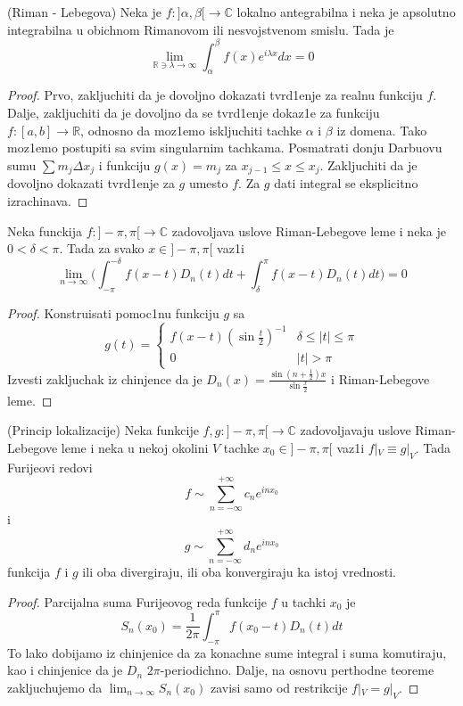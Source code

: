 \documentclass[a4paper,12pt]{article}
\newcommand{\RR}{\mathbb{R}}
\newcommand{\CC}{\mathbb{C}}
\begin{document}
\begin{lema}(Riman - Lebegova) Neka je $f: ]\alpha, \beta[ \to \CC$ lokalno antegrabilna i neka je apsolutno integrabilna u obichnom Rimanovom ili nesvojstvenom smislu. Tada je 
\[\lim_{\RR \ni \lambda \to \infty} \int_{\alpha}^{\beta} f(x) e^{i \lambda x} dx = 0\]
\end{lema}
\begin{proof}
Prvo, zakljuchiti da je dovoljno dokazati tvrd1enje za realnu funkciju $f$. Dalje, zakljuchiti da je dovoljno da se tvrd1enje dokaz1e za funkciju $f: [a,b] \to \RR$, odnosno da moz1emo iskljuchiti tachke $\alpha$ i  $\beta$ iz domena. Tako moz1emo postupiti sa svim singularnim tachkama. Posmatrati donju Darbuovu sumu $\sum m_j \Delta x_j$ i  funkciju $g(x) = m_j$ za $x_{j-1} \leq x \leq x_j$. Zakljuchiti da je dovoljno dokazati tvrd1enje za $g$ umesto $f$. Za $g$ dati integral se eksplicitno izrachinava.
\end{proof}
\begin{tma}
Neka funckija $f:]-\pi, \pi[ \to \CC$ zadovoljava uslove Riman-Lebegove leme i neka je $0 < \delta < \pi$. Tada za svako $x \in ]-\pi, \pi[$ vaz1i
\[\lim_{n \to \infty}\big(\int_{-\pi}^{-\delta}f(x-t)D_n(t) dt + \int_\delta^\pi f(x-t)D_n(t)dt\big) = 0\]
\end{tma}
\begin{proof}
Konstruisati pomoc1nu funkciju $g$ sa
\[
g(t) = \begin{cases}
  f(x-t) {(\sin \frac{t}{2})}^{-1}  & \delta \leq |t| \leq \pi \\
  0 & |t|>\pi
\end{cases}
\]
Izvesti zakljuchak iz chinjence da je $D_n(x) = \frac{\sin(n + \frac{1}{2})x}{\sin \frac{x}{2}}$ i Riman-Lebegove leme.
\end{proof}
\begin{posl}(Princip lokalizacije) Neka funkcije $f,g:]-\pi, \pi[ \to \CC$ zadovoljavaju uslove Riman-Lebegove leme i neka u nekoj okolini $V$ tachke $x_0 \in ]-\pi, \pi[$ vaz1i $f|_V \equiv g|_V$. Tada Furijeovi redovi 
\[f \sim \sum_{n = - \infty}^{+ \infty} c_n e^{inx_0}\]
i
\[g \sim \sum_{n = -\infty}^{+ \infty} d_n e^{inx_0} \]
funkcija $f$ i $g$ ili oba divergiraju, ili oba konvergiraju ka istoj vrednosti.
\end{posl}
\begin{proof}
Parcijalna suma Furijeovog reda funkcije $f$ u tachki $x_0$ je
\[S_n(x_0) = \frac{1}{2\pi} \int_{-\pi}^{\pi}f(x_0 - t) D_n(t) dt\]
To lako dobijamo iz chinjenice da za konachne sume integral i suma komutiraju, kao i chinjenice da je $D_n$ $2 \pi$-periodichno. Dalje, na osnovu perthodne teoreme zakljuchujemo da $\lim_{n\to \infty} S_n(x_0)$ zavisi samo od restrikcije $f|_V = g|_V$.
\end{proof}
\end{document}
